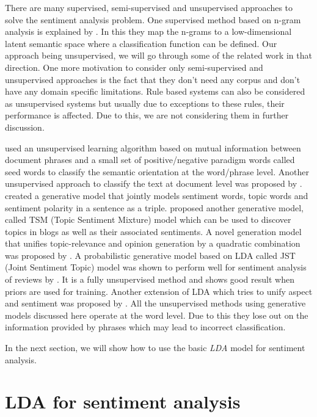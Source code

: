 There are many supervised, semi-supervised and unsupervised approaches to solve the sentiment analysis problem. One supervised method based on n-gram analysis is explained
by \citep*{bespalov2011sentiment}. In this they map the n-grams to a low-dimensional latent semantic space where a classification function can be defined. Our approach being
unsupervised, we will go through some of the related work in that direction. One more motivation to consider only semi-supervised and unsupervised approaches is the fact that
they don't need any corpus and don't have any domain specific limitations. Rule based systems can also be considered as unsupervised systems but usually due to exceptions to
these rules, their performance is affected. Due to this, we are not considering them in further discussion.

\citep*{turney2002thumbs} used an unsupervised learning algorithm based on mutual information between document phrases and a small set of positive/negative paradigm words 
called seed words to classify the semantic orientation at the word/phrase level. Another unsupervised approach to classify the text at document level was proposed by \citep*{turney2002unsupervised}. 
\citep*{eguchi2006sentiment} created a generative model that jointly models sentiment words, topic words and sentiment polarity in a sentence as a triple. \citep*{mei2007topic} 
proposed another generative model, called TSM (Topic Sentiment Mixture) model which can be used to discover topics in blogs as well as their associated sentiments. A novel 
generation model that unifies topic-relevance and opinion generation by a quadratic combination was proposed by \citep*{zhang2008generation}. A probabilistic generative model 
based on LDA called JST (Joint Sentiment Topic) model was shown to perform well for sentiment analysis of reviews by \citep*{lin2009joint}. It is a fully unsupervised method
and shows good result when priors are used for training. Another extension of LDA which tries to unify aspect and sentiment was proposed by \citep*{jo2011aspect}. All the 
unsupervised methods using generative models discussed here operate at the word level. Due to this they lose out on the information provided by phrases which may lead to 
incorrect classification.

In the next section, we will show how to use the basic \textit{LDA} model for sentiment analysis.

\section{LDA for sentiment analysis}

